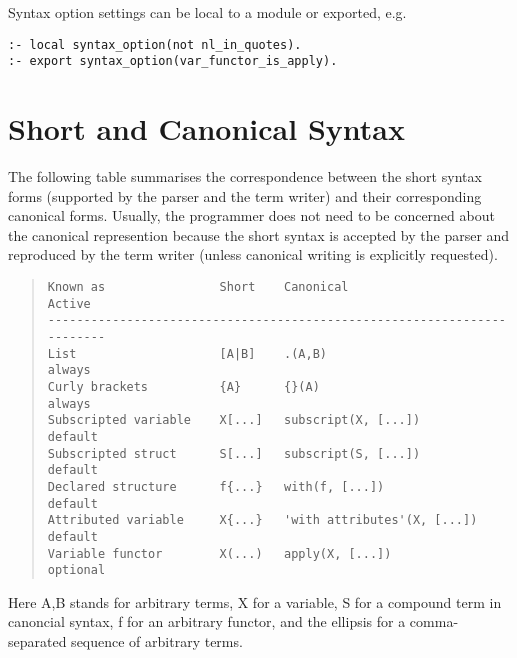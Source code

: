 Syntax option  settings can be local to a module or exported, e.g.
\begin{verbatim}
:- local syntax_option(not nl_in_quotes).
:- export syntax_option(var_functor_is_apply).
\end{verbatim}

\section{Short and Canonical Syntax}

The following table summarises the correspondence between the short syntax
forms (supported by the parser and the term writer) and their corresponding
canonical forms. Usually, the programmer does not need to be concerned about
the canonical represention because the short syntax is accepted by the parser
and reproduced by the term writer (unless canonical writing is explicitly
requested).
\begin{quote}\begin{verbatim}
Known as                Short    Canonical                    Active
------------------------------------------------------------------------
List                    [A|B]    .(A,B)                       always
Curly brackets          {A}      {}(A)                        always
Subscripted variable    X[...]   subscript(X, [...])          default
Subscripted struct      S[...]   subscript(S, [...])          default
Declared structure      f{...}   with(f, [...])               default
Attributed variable     X{...}   'with attributes'(X, [...])  default
Variable functor        X(...)   apply(X, [...])              optional
\end{verbatim}\end{quote}
Here A,B stands for arbitrary terms, X for a variable, S for a compound term
in canoncial syntax, f for an arbitrary functor, and the ellipsis for
a comma-separated sequence of arbitrary terms.

